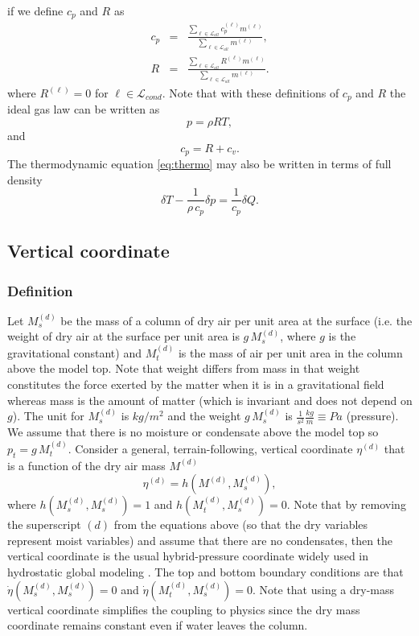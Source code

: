 \documentclass{agujournal}
\begin{document}
{\begin{equation}
\end{equation}
if we define $c_p$ and $R$ as
\begin{eqnarray}
c_p&=&\frac{\sum_{\ell \in \mathcal{L}_{all}} c_p^{(\ell)}m^{(\ell)}}{\sum_{\ell \in \mathcal{L}_{all}} m^{(\ell)}},\label{eq:cp} \\
R  &=&\frac{\sum_{\ell \in \mathcal{L}_{all}} R^{(\ell)} m^{(\ell)}}{\sum_{\ell \in \mathcal{L}_{all}} m^{(\ell)}}.
\end{eqnarray}
where $R^{(\ell)}=0$ for $\ell \in \mathcal{L}_{cond}$. Note that with these definitions of $c_p$ and $R$ the ideal gas law can be written as
\begin{equation}
p=\rho R T,\label{eq:ig4}
\end{equation}
and 
\begin{equation}
c_p=R+c_v.
\end{equation}
The thermodynamic equation \eqref{eq:thermo} may also be written in terms of full density
\begin{equation}
\delta T-\frac{1}{\rho\, c_p}\delta p=\frac{1}{c_p}\delta Q\label{eq:thermo2}.
\end{equation}
%
\subsection{Vertical coordinate}\label{eq:vertical_coord}
\subsubsection{Definition}
Let $M^{(d)}_s$ be the mass of a column of dry air per unit area at the surface (i.e. the weight of dry air at the surface per unit area is $g\, M^{(d)}_s$, where $g$ is the gravitational constant) and $M_t^{(d)}$ is the mass of air per unit area in the column above the model top. Note that weight differs from mass in that weight constitutes the force exerted by the matter when it is in a gravitational field whereas mass is the amount of matter (which is invariant and does not depend on $g$). The unit for $M^{(d)}_s$ is $kg/m^2$ and the weight $g\, M^{(d)}_s$ is $\frac{1}{s^2}\frac{kg}{m}\equiv Pa$ (pressure). We assume that there is no moisture or condensate above the model top so $p_t=g\, M_t^{(d)}$. Consider a general, terrain-following, vertical coordinate $\eta^{(d)}$ that is a function of the dry air mass $M^{(d)}$ 
\begin{equation}
\eta^{(d)}=h(M^{(d)},M_s^{(d)}),
\end{equation}
where $h(M_s^{(d)},M_s^{(d)})=1$ and $h(M_t^{(d)},M_s^{(d)})=0$. Note that by removing the superscript $(d)$ from the equations above (so that the dry variables represent moist variables) and assume that there are no condensates, then the vertical coordinate is the usual hybrid-pressure coordinate widely used in hydrostatic global modeling \citep{SB1981MWR}. The top and bottom boundary conditions are that $\dot{\eta}\left({M_s^{(d)},M_s^{(d)}}\right)=0$ and $\dot{\eta}\left( M_t^{(d)},M_s^{(d)}\right)=0$. Note that using a dry-mass vertical coordinate simplifies the coupling to physics since the dry mass coordinate remains constant even if water leaves the column.
}
\end{document}

